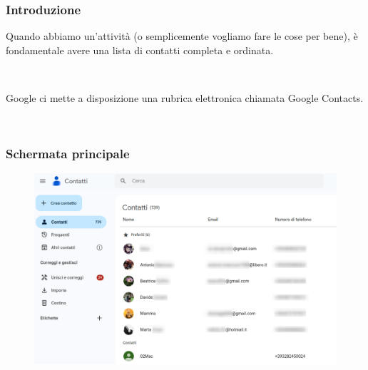 \documentclass[]{beamer}
\begin{document}
\begin{frame}
\frametitle{Introduzione}
Quando abbiamo un'attività (o semplicemente vogliamo fare le cose per bene), è fondamentale avere una lista di contatti \alert{completa} e \alert{ordinata}.\pause

~

Google ci mette a disposizione una \alert{rubrica elettronica} chiamata Google Contacts.

~

\end{frame}



\begin{frame}
\frametitle{Schermata principale}
\begin{figure}
  \includegraphics[width=\columnwidth]{img/contatti2.png}
\end{figure}
\end{frame}
\end{document}
